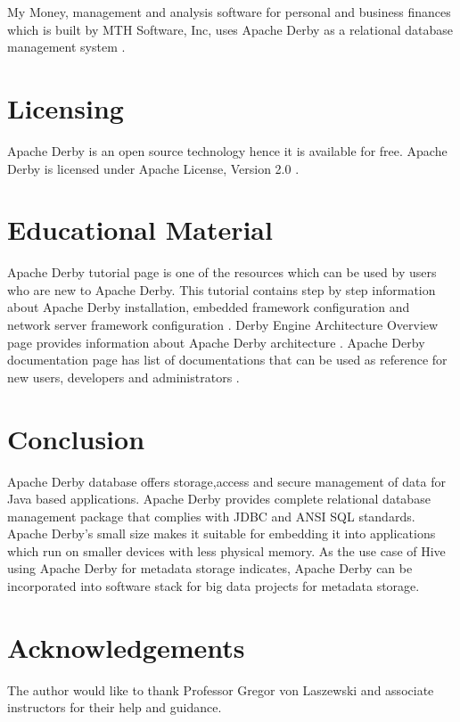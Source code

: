 \documentclass[9pt,twocolumn,twoside]{../../styles/osajnl}
\begin{document}
My Money, management and analysis software for personal and business
finances which is built by MTH Software, Inc, uses Apache Derby as a
relational database management system \cite {www-mymoney,
  www-mymoneywiki}.

\section{Licensing}

Apache Derby is an open source technology hence it is available for
free. Apache Derby is licensed under Apache License, Version 2.0
\cite {www-derbyoverview}.

\section {Educational Material}

Apache Derby tutorial page is one of the resources which can be used
by users who are new to Apache Derby. This tutorial contains step by
step information about Apache Derby installation, embedded framework
configuration and network server framework configuration \cite
{www-derbytutorial}. Derby Engine Architecture Overview page provides
information about Apache Derby architecture \cite
{www-derbyarch}. Apache Derby documentation page has list of
documentations that can be used as reference for new users, developers
and administrators \cite {www-derbdoc}.

\section {Conclusion}

Apache Derby database offers storage,access and secure management of
data for Java based applications. Apache Derby provides complete
relational database management package that complies with JDBC and
ANSI SQL standards. Apache Derby's small size makes it suitable for
embedding it into applications which run on smaller devices with less
physical memory. As the use case of Hive using Apache Derby for
metadata storage indicates, Apache Derby can be incorporated into
software stack for big data projects for metadata storage.

\section*{Acknowledgements}

The author would like to thank Professor Gregor von Laszewski and
associate instructors for their help and guidance.




\newpage
\appendix
\end{document}

